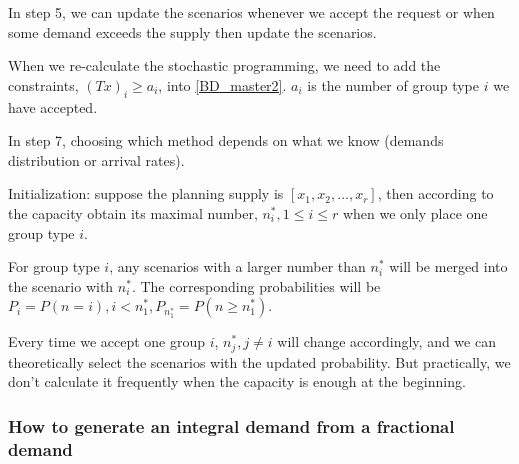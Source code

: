 In step 5, we can update the scenarios whenever we accept the request or when some demand exceeds the supply then update the scenarios.

When we re-calculate the stochastic programming, we need to add the constraints, $(Tx)_{i} \geq a_{i}$, into \eqref{BD_master2}. $a_{i}$ is the number of group type $i$ we have accepted.

In step 7, choosing which method depends on what we know (demands distribution or arrival rates).

Initialization: suppose the planning supply is $[x_{1}, x_{2}, \ldots, x_{r}]$, then according to the capacity obtain its maximal number, $n_{i}^{*}, 1 \leq i \leq r$ when we only place one group type $i$.

For group type $i$, any scenarios with a larger number than $n_{i}^{*}$ will be merged into the scenario with $n_{i}^{*}$.
The corresponding probabilities will be $P_{i} = P(n = i), i < n_{1}^{*}, P_{n_{1}^{*}} = P(n \geq n_{1}^{*})$.

Every time we accept one group $i$, $n_{j}^{*}, j \neq i$ will change accordingly, and we can theoretically select the scenarios with the updated probability. 
But practically, we don't calculate it frequently when the capacity is enough at the beginning.








\subsubsection{How to generate an integral demand from a fractional demand}

